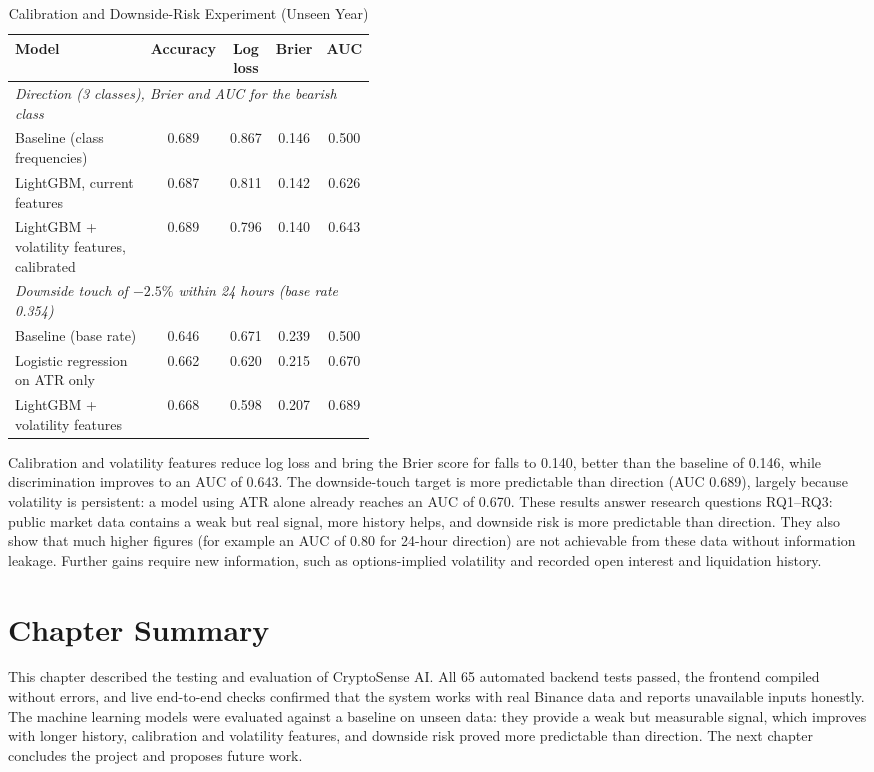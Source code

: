 {\renewcommand{\arraystretch}{1.3}
\begin{longtable}{|p{0.42\linewidth}|c|c|c|c|}
\caption{Calibration and Downside-Risk Experiment (Unseen Year)}\label{tab:ml-experiment}\\\hline
\textbf{Model} & \textbf{Accuracy} & \textbf{Log loss} & \textbf{Brier} & \textbf{AUC}\\\hline
\multicolumn{5}{|l|}{\textit{Direction (3 classes), Brier and AUC for the bearish class}}\\\hline
Baseline (class frequencies) & 0.689 & 0.867 & 0.146 & 0.500\\\hline
LightGBM, current features & 0.687 & 0.811 & 0.142 & 0.626\\\hline
LightGBM + volatility features, calibrated & 0.689 & 0.796 & 0.140 & 0.643\\\hline
\multicolumn{5}{|l|}{\textit{Downside touch of $-2.5\%$ within 24 hours (base rate 0.354)}}\\\hline
Baseline (base rate) & 0.646 & 0.671 & 0.239 & 0.500\\\hline
Logistic regression on ATR only & 0.662 & 0.620 & 0.215 & 0.670\\\hline
LightGBM + volatility features & 0.668 & 0.598 & 0.207 & 0.689\\\hline
\end{longtable}}

Calibration and volatility features reduce log loss and bring the Brier score for falls to 0.140, better than the baseline of 0.146, while discrimination improves to an AUC of 0.643. The downside-touch target is more predictable than direction (AUC 0.689), largely because volatility is persistent: a model using ATR alone already reaches an AUC of 0.670. These results answer research questions RQ1--RQ3: public market data contains a weak but real signal, more history helps, and downside risk is more predictable than direction. They also show that much higher figures (for example an AUC of 0.80 for 24-hour direction) are not achievable from these data without information leakage. Further gains require new information, such as options-implied volatility and recorded open interest and liquidation history.

\section{Chapter Summary}
This chapter described the testing and evaluation of CryptoSense AI. All 65 automated backend tests passed, the frontend compiled without errors, and live end-to-end checks confirmed that the system works with real Binance data and reports unavailable inputs honestly. The machine learning models were evaluated against a baseline on unseen data: they provide a weak but measurable signal, which improves with longer history, calibration and volatility features, and downside risk proved more predictable than direction. The next chapter concludes the project and proposes future work.
